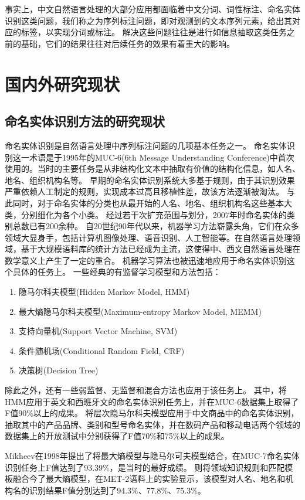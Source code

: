 事实上，中文自然语言处理的大部分应用都面临着中文分词、词性标注、命名实体识别这类问题，我们称之为序列标注问题，即对观测到的文本序列元素，给出其对应的标签，以实现分词或标注。
解决这些问题往往是进行如信息抽取这类任务之前的基础，它们的结果往往对后续任务的效果有着重大的影响。

\section{国内外研究现状}
\label{sec:current}
\subsection{命名实体识别方法的研究现状}
命名实体识别是自然语言处理中序列标注问题的几项基本任务之一。
命名实体识别这一术语是于1995年的MUC-6(6th Message Understanding Conference)中首次使用的。当时的主要任务是从非结构化文本中抽取有价值的结构化信息，如人名、地名、组织机构名等。
早期的命名实体识别系统大多基于规则，由于其识别效果严重依赖人工制定的规则，实现成本过高且移植性差，故该方法逐渐被淘汰。
与此同时，对于命名实体的分类也从最开始的人名、地名、组织机构名这些基本大类，分别细化为各个小类。
经过若干次扩充范围与划分，2007年时命名实体的类别总数已有200余种。
自20世纪90年代以来，机器学习方法崭露头角，它们在众多领域大显身手，包括计算机图像处理、语音识别、人工智能等。在自然语言处理领域，基于大规模语料库的统计方法已经成为主流，这使得中、西文自然语言处理在数学意义上产生了一定的重合。
机器学习算法也被迅速地应用于命名实体识别这个具体的任务上。
一些经典的有监督学习模型和方法包括：
\begin{enumerate}[\indent(1)]
    \item 隐马尔科夫模型(Hidden Markov Model, HMM)
    \item 最大熵隐马尔科夫模型(Maximum-entropy Markov Model, MEMM)
    \item 支持向量机(Support Vector Machine, SVM)
    \item 条件随机场(Conditional Random Field, CRF)
    \item 决策树(Decision Tree)
\end{enumerate}
除此之外，还有一些弱监督、无监督和混合方法也应用于该任务上。
其中，\citet{bikel1997nymble}将HMM应用于英文和西班牙文的命名实体识别任务上，并在MUC-6数据集上取得了F值90\%以上的成果。
\citet{liu2005product}将层次隐马尔科夫模型应用于中文商品中的命名实体识别，抽取其中的产品品牌、类别和型号命名实体，并在数码产品和移动电话两个领域的数据集上的开放测试中分别获得了F值70\%和75\%以上的成果。

Mikheev\citep{mikheev1998description}在1998年提出了将最大熵模型与隐马尔可夫模型结合，在MUC-7命名实体识别任务上F值达到了93.39\%，是当时的最好成绩。
\citet{tsai2004mencius}则将领域知识规则和匹配模板融合今了最大熵模型，在MET-2语料上的实验显示，该模型对人名、地名和机构名的识别结果F值分别达到了94.3\%、77.8\%、75.3\%。

